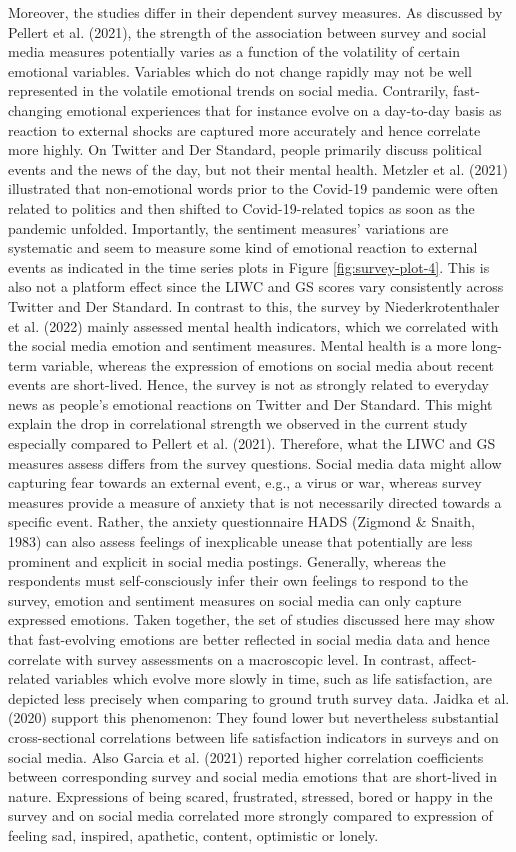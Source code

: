 \documentclass[
  english,
  jou,floatsintext]{apa7}
\begin{document}
Moreover, the studies differ in their dependent survey measures. As discussed by Pellert et al. (2021), the strength of the association between survey and social media measures potentially varies as a function of the volatility of certain emotional variables. Variables which do not change rapidly may not be well represented in the volatile emotional trends on social media. Contrarily, fast-changing emotional experiences that for instance evolve on a day-to-day basis as reaction to external shocks are captured more accurately and hence correlate more highly.
On Twitter and Der Standard, people primarily discuss political events and the news of the day, but not their mental health. Metzler et al. (2021) illustrated that non-emotional words prior to the Covid-19 pandemic were often related to politics and then shifted to Covid-19-related topics as soon as the pandemic unfolded. Importantly, the sentiment measures' variations are systematic and seem to measure some kind of emotional reaction to external events as indicated in the time series plots in Figure \ref{fig:survey-plot-4}. This is also not a platform effect since the LIWC and GS scores vary consistently across Twitter and Der Standard. In contrast to this, the survey by Niederkrotenthaler et al. (2022) mainly assessed mental health indicators, which we correlated with the social media emotion and sentiment measures.
Mental health is a more long-term variable, whereas the expression of emotions on social media about recent events are short-lived. Hence, the survey is not as strongly related to everyday news as people's emotional reactions on Twitter and Der Standard. This might explain the drop in correlational strength we observed in the current study especially compared to Pellert et al. (2021).
Therefore, what the LIWC and GS measures assess differs from the survey questions. Social media data might allow capturing fear towards an external event, e.g., a virus or war, whereas survey measures provide a measure of anxiety that is not necessarily directed towards a specific event. Rather, the anxiety questionnaire HADS (Zigmond \& Snaith, 1983) can also assess feelings of inexplicable unease that potentially are less prominent and explicit in social media postings. Generally, whereas the respondents must self-consciously infer their own feelings to respond to the survey, emotion and sentiment measures on social media can only capture expressed emotions.
Taken together, the set of studies discussed here may show that fast-evolving emotions are better reflected in social media data and hence correlate with survey assessments on a macroscopic level. In contrast, affect-related variables which evolve more slowly in time, such as life satisfaction, are depicted less precisely when comparing to ground truth survey data. Jaidka et al. (2020) support this phenomenon: They found lower but nevertheless substantial cross-sectional correlations between life satisfaction indicators in surveys and on social media. Also Garcia et al. (2021) reported higher correlation coefficients between corresponding survey and social media emotions that are short-lived in nature. Expressions of being scared, frustrated, stressed, bored or happy in the survey and on social media correlated more strongly compared to expression of feeling sad, inspired, apathetic, content, optimistic or lonely.
\end{document}

